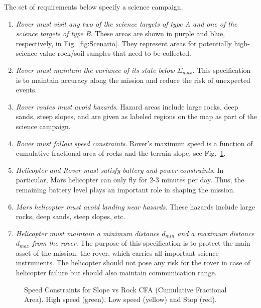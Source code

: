\documentclass[conference]{IEEEtran}
\begin{document}
	The set of requirements below specify a science campaign.
	\begin{enumerate}
      \item \textit{Rover must visit any two of the science targets of type A and one of the science targets of type B}. These areas are shown in purple and blue, respectively, in Fig. \ref{fig:Scenario}. They represent areas for potentially high-science-value rock/soil samples that need to be collected.
      \item \textit{Rover must maintain the variance of its state below $\Sigma_{max}$}. This specification is to maintain accuracy along the mission and reduce the risk of unexpected events.
      \item \textit{Rover routes must avoid hazards}. Hazard areas include large rocks, deep sands, steep slopes, and are given as labeled regions on the map as part of the science campaign.
      \item \textit{Rover must follow speed constraints}.
      Rover's maximum speed is a function of cumulative fractional area of rocks and the terrain slope, see Fig.~\ref{fig:SpeedConstriants}.
      \item \textit{Helicopter and Rover must satisfy battery and power constraints}. In particular, Mars helicopter can only fly for 2-3 minutes per day. Thus, the remaining battery level plays an important role in shaping the mission.
      \item \textit{Mars helicopter must avoid landing near hazards}. These hazards include large rocks, deep sands, steep slopes, etc.
      \item \textit{Helicopter must maintain a minimum distance $d_{min}$ and a maximum distance $d_{max}$ from the rover}. The purpose of this specification is to protect the main asset of the mission: the rover, which carries all important science instruments. The helicopter should not pose any risk for the rover in case of helicopter failure but should also maintain communication range.
    \end{enumerate}

    \begin{figure}[h]
	\centering
	\scalebox{.45}{}
	\caption{Speed Constraints for Slope vs Rock CFA (Cumulative Fractional Area). High speed (green), Low speed (yellow) and Stop (red).}
	\label{fig:SpeedConstriants}
    \end{figure}
\end{document}
